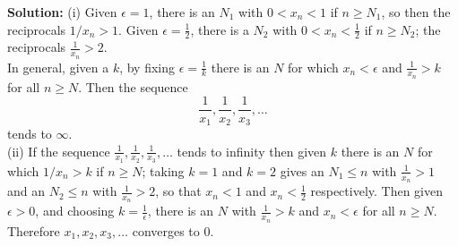 \documentclass{article}
\newcommand{\solution}[1]{\setlength{\hangindent}{\parindent} \indent\indent \textbf{Solution: }#1\hfill\break}
\begin{document}
\solution{(i) Given $\epsilon =1$, there is an $N_1$ with $0<x_n < 1$ if $n\geqslant N_1$, so then the reciprocals $1/x_n > 1$. Given $\epsilon = \frac{1}{2}$, there is a $N_2$ with $0<x_n < \frac{1}{2}$ if $n \geqslant N_2$; the reciprocals $\frac{1}{x_n} > 2$.\\
\indent In general, given a $k$, by fixing $\epsilon = \frac{1}{k}$ there is an $N$ for which $x_n < \epsilon$ and $\frac{1}{x_n} > k$ for all $n\geqslant N$. Then the sequence 
$$\frac{1}{x_1}, \frac{1}{x_2}, \frac{1}{x_3}, \dots$$
tends to $\infty$. \\
\indent (ii) If the sequence $\frac{1}{x_1}, \frac{1}{x_2}, \frac{1}{x_3}, \dots$ tends to infinity then given $k$ there is an $N$ for which $1/x_n > k$ if $n\geqslant N$; taking $k=1$ and $k=2$ gives an $N_1\leq n$ with $\frac{1}{x_n} > 1$ and an $N_2\leq n$ with $\frac{1}{x_n}>2$, so that $x_n < 1$ and $x_n < \frac{1}{2}$ respectively. Then given $\epsilon > 0$, and choosing $k=\frac{1}{\epsilon}$, there is an $N$ with $\frac{1}{x_n} >k$ and $x_n <\epsilon$ for all $n\geqslant N$. Therefore $x_1, x_2, x_3,\dots$ converges to 0.}%

\newpage
\end{document}
